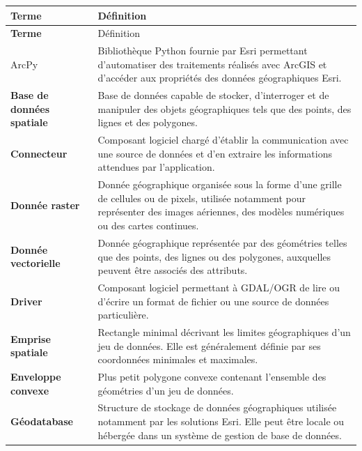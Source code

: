 \begin{longtable}{
    @{}
    >{\bfseries}p{}
    p{}
    @{}
}

\toprule
Terme & Définition \\
\midrule
\endfirsthead

\toprule
Terme & Définition \\
\midrule
\endhead

\bottomrule
\endlastfoot

ArcPy
&
Bibliothèque Python fournie par Esri permettant d'automatiser des traitements
réalisés avec ArcGIS et d'accéder aux propriétés des données géographiques
Esri.
\\

Base de données spatiale
&
Base de données capable de stocker, d'interroger et de manipuler des objets
géographiques tels que des points, des lignes et des polygones.
\\

Connecteur
&
Composant logiciel chargé d'établir la communication avec une source de données
et d'en extraire les informations attendues par l'application.
\\

Donnée raster
&
Donnée géographique organisée sous la forme d'une grille de cellules ou de
pixels, utilisée notamment pour représenter des images aériennes, des modèles
numériques ou des cartes continues.
\\

Donnée vectorielle
&
Donnée géographique représentée par des géométries telles que des points, des
lignes ou des polygones, auxquelles peuvent être associés des attributs.
\\

Driver
&
Composant logiciel permettant à GDAL/OGR de lire ou d'écrire un format de
fichier ou une source de données particulière.
\\

Emprise spatiale
&
Rectangle minimal décrivant les limites géographiques d'un jeu de données. Elle
est généralement définie par ses coordonnées minimales et maximales.
\\

Enveloppe convexe
&
Plus petit polygone convexe contenant l'ensemble des géométries d'un jeu de
données.
\\

Géodatabase
&
Structure de stockage de données géographiques utilisée notamment par les
solutions Esri. Elle peut être locale ou hébergée dans un système de gestion de
base de données.
\\


\end{longtable}
